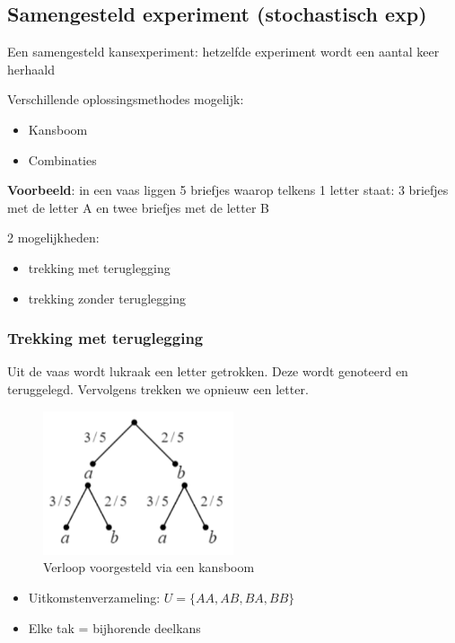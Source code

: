 \documentclass{article}
\begin{document}
\subsection{Samengesteld experiment (stochastisch exp)}

Een samengesteld kansexperiment: hetzelfde experiment wordt een aantal keer herhaald

Verschillende oplossingsmethodes mogelijk:

\begin{itemize}
    \item Kansboom
    \item Combinaties
\end{itemize}

\textbf{Voorbeeld}: in een vaas liggen 5 briefjes waarop telkens 1 letter staat: 3 briefjes met de letter A en twee briefjes met de letter B

2 mogelijkheden: 

\begin{itemize}
    \item trekking met teruglegging
    \item trekking zonder teruglegging
\end{itemize}

\subsubsection{Trekking met teruglegging}

Uit de vaas wordt lukraak een letter getrokken. Deze wordt genoteerd
en teruggelegd. Vervolgens trekken we opnieuw een letter.

\begin{figure}[H]
    \centering
    \includegraphics[width=0.5\textwidth]{trekking-met-teruglegging-kansboom.png}
    \caption{Verloop voorgesteld via een kansboom}
\end{figure}

\begin{itemize}
    \item Uitkomstenverzameling: $U = \{AA, AB, BA, BB\}$
    \item Elke tak = bijhorende deelkans
\end{itemize}
\end{document}
